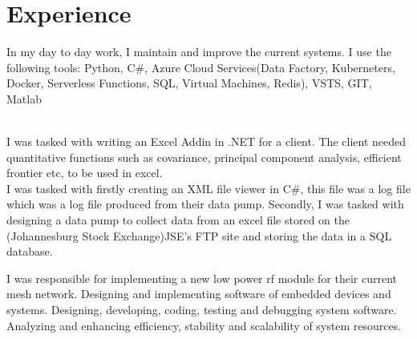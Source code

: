 \documentclass[]{deedy-resume-openfont}
\begin{document}
\hfill
\begin{minipage}[t]{0.66\textwidth} 


\section{Experience}

In my day to day work, I maintain and improve the current systems. I use the following tools: Python, C#, Azure Cloud Services(Data Factory, Kuberneters, Docker, Serverless Functions, SQL, Virtual Machines, Redis), VSTS, GIT, Matlab
\sectionsep

\\
I was tasked with writing an Excel Addin in .NET for a client. The client needed quantitative functions such as covariance, principal component analysis, efficient frontier etc, to be used in excel.
\sectionsep
\\
I was tasked with firstly creating an XML file viewer in C#, this file was a log file which was a log file produced from their data pump. Secondly, I was tasked with designing a data pump to collect data from an excel file stored on the (Johannesburg Stock Exchange)JSE’s FTP site and storing the data in a SQL database.
\sectionsep


I was responsible for implementing a new low power rf module for their current mesh network. Designing and implementing software of embedded devices and systems. Designing, developing, coding, testing and debugging system software. Analyzing and enhancing efficiency, stability and scalability of system resources.
\sectionsep


\end{minipage}
\end{document}
